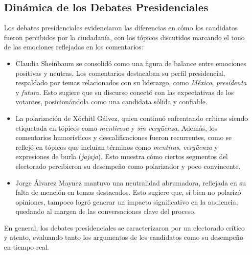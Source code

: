 \documentclass[10pt, a4paper]{article}
\begin{document}
	\subsection{Dinámica de los Debates Presidenciales}
	Los debates presidenciales evidenciaron las diferencias en cómo los candidatos fueron percibidos por la ciudadanía, con los tópicos discutidos marcando el tono de las emociones reflejadas en los comentarios:
	\begin{itemize}
		\item Claudia Sheinbaum se consolidó como una figura de balance entre emociones positivas y neutras. Los comentarios destacaban su perfil presidencial, respaldado por temas relacionados con su liderazgo, como \textit{México}, \textit{presidenta} y \textit{futuro}. Esto sugiere que su discurso conectó con las expectativas de los votantes, posicionándola como una candidata sólida y confiable.
		\item La polarización de Xóchitl Gálvez, quien continuó enfrentando críticas siendo etiquetada en tópicos como \textit{mentirosa} y \textit{sin vergüenza}. Además, los comentarios humorísticos y descalificaciones fueron recurrentes, como se reflejó en tópicos que incluían términos como \textit{mentiras}, \textit{vergüenza} y expresiones de burla (\textit{jajaja}). Esto muestra cómo ciertos segmentos del electorado percibieron su desempeño como polarizador y poco convincente.
		\item Jorge Álvarez Maynez mantuvo una neutralidad abrumadora, reflejada en su falta de mención en temas destacados. Esto sugiere que, si bien no polarizó opiniones, tampoco logró generar un impacto significativo en la audiencia, quedando al margen de las conversaciones clave del proceso.
	\end{itemize}
	En general, los debates presidenciales se caracterizaron por un electorado crítico y atento, evaluando tanto los argumentos de los candidatos como su desempeño en tiempo real.
	
\end{document}
